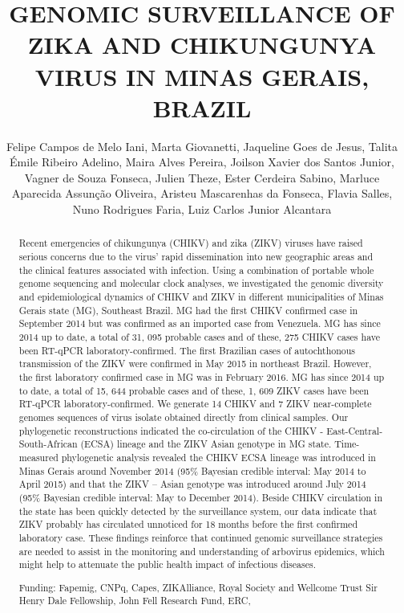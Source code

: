 \documentclass[twoside]{article}
\title{\vspace{-15mm}\fontsize{24pt}{10pt}\selectfont\textbf{ GENOMIC SURVEILLANCE OF ZIKA AND CHIKUNGUNYA VIRUS IN MINAS GERAIS,  BRAZIL }} %
\author{ Felipe Campos de Melo Iani, Marta Giovanetti, Jaqueline Goes de Jesus, Talita \'Emile Ribeiro Adelino, Maira Alves Pereira, Joilson Xavier dos Santos Junior, Vagner de Souza Fonseca, Julien Theze, Ester Cerdeira Sabino, Marluce Aparecida Assun\c{c}\~ao Oliveira, Aristeu Mascarenhas da Fonseca, Flavia Salles, Nuno Rodrigues Faria, Luiz Carlos Junior Alcantara }
\affil{ Laborat\'orio de Gen\'etica Celular e Molecular,  ICB,  Universidade Federal de Minas Gerais,  Belo Horizonte,  Minas Gerais,  Brazil }
\date{}
\begin{document}
  
  
  \maketitle %
  
  
  \thispagestyle{fancy} %
  
  
  \begin{abstract}
  Recent emergencies of chikungunya (CHIKV) and zika (ZIKV) viruses have raised serious concerns due to the virus’ rapid dissemination into new geographic areas and the clinical features associated with infection. Using a combination of portable whole genome sequencing and molecular clock analyses,  we investigated the genomic diversity and epidemiological dynamics of CHIKV and ZIKV in different municipalities of Minas Gerais state (MG),  Southeast Brazil. MG had the first CHIKV confirmed case in September 2014 but was confirmed as an imported case from Venezuela. MG has since 2014 up to date,  a total of 31, 095 probable cases and of these,  275 CHIKV cases have been RT-qPCR laboratory-confirmed. The first Brazilian cases of autochthonous transmission of the ZIKV were confirmed in May 2015 in northeast Brazil. However,  the first laboratory confirmed case in MG was in February 2016. MG has since 2014 up to date,  a total of 15, 644 probable cases and of these,  1, 609 ZIKV cases have been RT-qPCR laboratory-confirmed. We generate 14 CHIKV and 7 ZIKV near-complete genomes sequences of virus isolate obtained directly from clinical samples. Our phylogenetic reconstructions indicated the co-circulation of the CHIKV - East-Central-South-African (ECSA) lineage and the ZIKV Asian genotype in MG state. Time-measured phylogenetic analysis revealed the CHIKV ECSA lineage was introduced in Minas Gerais around November 2014 (95\% Bayesian credible interval: May 2014 to April 2015) and that the ZIKV – Asian genotype was introduced around July 2014 (95\% Bayesian credible interval: May to December 2014). Beside CHIKV circulation in the state has been quickly detected by the surveillance system,  our data indicate that ZIKV probably has circulated unnoticed for 18 months before the first confirmed laboratory case. These findings reinforce that continued genomic surveillance strategies are needed to assist in the monitoring and understanding of arbovirus epidemics,  which might help to attenuate the public health impact of infectious diseases.
  
  Funding: Fapemig,  CNPq,  Capes,  ZIKAlliance,  Royal Society and Wellcome Trust Sir Henry Dale Fellowship,  John Fell Research Fund,  ERC,  \\ 
  \end{abstract}
  
\end{document}
